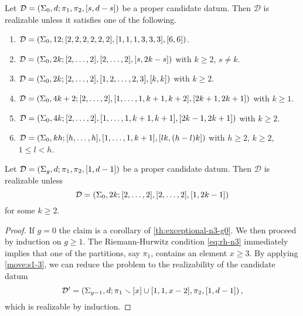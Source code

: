 \documentclass{article}
\begin{document}
\begin{theorem}\label{th:exceptional-n3-g0}
Let $\mathcal{D}=\left(\Sigma_0,d;\pi_1,\pi_2,[s,d-s]\right)$ be a proper candidate datum. Then $\mathcal{D}$ is realizable unless it satisfies one of the following.
\begin{enumerate}
\item $\mathcal{D}=\left(\Sigma_0,12;[2,2,2,2,2,2],[1,1,1,3,3,3],[6,6]\right)$.
\item $\mathcal{D}=\left(\Sigma_0,2k;[2,\ldots,2],[2,\ldots,2],[s,2k-s]\right)$ with $k\ge 2$, $s\neq k$.
\item $\mathcal{D}=\left(\Sigma_0,2k;[2,\ldots,2],[1,2,\ldots,2,3],[k,k]\right)$ with $k\ge2$.
\item $\mathcal{D}=\left(\Sigma_0,4k+2;[2,\ldots,2],[1,\ldots,1,k+1,k+2],[2k+1,2k+1]\right)$ with $k\ge 1$.
\item $\mathcal{D}=\left(\Sigma_0,4k;[2,\ldots,2],[1,\ldots,1,k+1,k+1],[2k-1,2k+1]\right)$ with $k\ge2$.
\item $\mathcal{D}=\left(\Sigma_0,kh;[h,\ldots,h],[1,\ldots,1,k+1],[lk,(h-l)k]\right)$ with $h\ge 2$, $k\ge 2$, $1\le l<h$.
\end{enumerate}
\end{theorem}

\begin{lemma}\label{th:exceptional-n3-s1}
Let $\mathcal{D}=\left(\Sigma_g,d;\pi_1,\pi_2,[1,d-1]\right)$ be a proper candidate datum. Then $\mathcal{D}$ is realizable unless
\[
\mathcal{D}=\left(\Sigma_0,2k;[2,\ldots,2],[2,\ldots,2],[1,2k-1]\right)
\]
for some $k\ge 2$.
\end{lemma}
\begin{proof}
If $g=0$ the claim is a corollary of \cref{th:exceptional-n3-g0}. We then proceed by induction on $g\ge 1$. The Riemann-Hurwitz condition \eqref{eq:rh-n3} immediately implies that one of the partitions, say $\pi_1$, contains an element $x\ge 3$. By applying \cref{move:s1-3}, we can reduce the problem to the realizability of the candidate datum
\[
\mathcal{D}'=\left(\Sigma_{g-1},d;\pi_1\smallsetminus[x]\cup[1,1,x-2],\pi_2,[1,d-1]\right),
\]
which is realizable by induction.
\end{proof}
\end{document}
